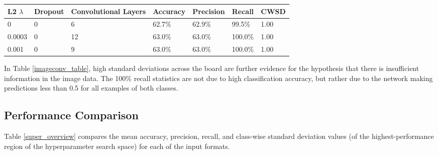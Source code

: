 \documentclass[10pt]{article}
\begin{document}
\begin{minipage}{\textwidth}
    \begin{center}
         \label{imageconv_table}
        \begin{tabular}{|l|l|l|l|l|l|l|}
            \hline
            L2 $\lambda$ & Dropout & Convolutional Layers & Accuracy & Precision & Recall & CWSD \\
            \hline
            0 & 0 & 6 & 62.7\% & 62.9\% & 99.5\% & 1.00 \\
            \hline
            0.0003 & 0 & 12 & 63.0\% & 63.0\% & 100.0\% & 1.00 \\
            \hline
            0.001 & 0 & 9 & 63.0\% & 63.0\% & 100.0\% & 1.00 \\
            \hline
        \end{tabular}
    \end{center}
\end{minipage}

In Table \ref{imageconv_table}, high standard deviations across the board are further evidence for the hypothesis that there is insufficient information in the image data. The 100\% recall statistics are not due to high classification accuracy, but rather due to the network making predictions less than 0.5 for all examples of both classes.

\subsection{Performance Comparison}

Table \ref{super_overview} compares the mean accuracy, precision, recall, and class-wise standard deviation values (of the highest-performance region of the hyperparameter search space) for each of the input formats.
\end{document}
